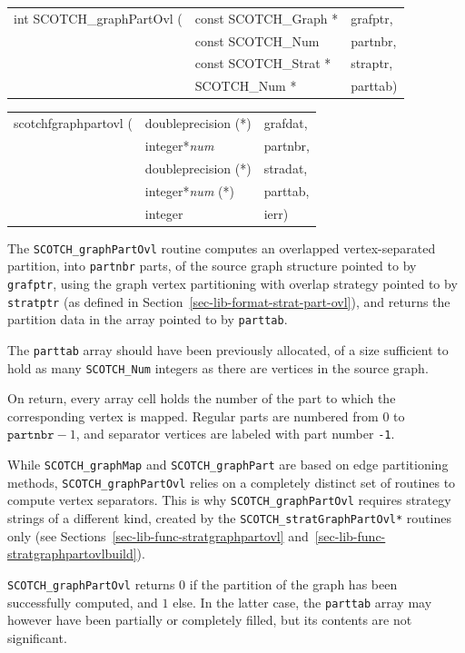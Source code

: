 \begin{itemize}
\progsyn

{\tt\begin{tabular}{l@{}ll}
int SCOTCH\_graphPartOvl ( & const SCOTCH\_Graph * & grafptr, \\
                           & const SCOTCH\_Num     & partnbr, \\
                           & const SCOTCH\_Strat * & straptr, \\
                           & SCOTCH\_Num *         & parttab)
\end{tabular}}

{\tt\begin{tabular}{l@{}ll}
scotchfgraphpartovl ( & doubleprecision (*)   & grafdat, \\
                      & integer*{\it num}     & partnbr, \\
                      & doubleprecision (*)   & stradat, \\
                      & integer*{\it num} (*) & parttab, \\
                      & integer               & ierr)
\end{tabular}}

\progdes

The {\tt SCOTCH\_graphPartOvl} routine computes an overlapped
vertex-separated partition, into {\tt partnbr} parts, of the source
graph structure pointed to by {\tt grafptr}, using the graph vertex
partitioning with overlap strategy pointed to by {\tt stratptr} (as
defined in Section~\ref{sec-lib-format-strat-part-ovl}), and returns
the partition data in the array pointed to by {\tt parttab}.

The {\tt parttab} array should have been previously allocated, of a
size sufficient to hold as many {\tt SCOTCH\_\lbt Num} integers as
there are vertices in the source graph.

On return, every array cell holds the number of the part to which the
corresponding vertex is mapped. Regular parts are numbered from $0$ to
$\mathtt{partnbr} - 1$, and separator vertices are labeled with part
number {\tt -1}.

While {\tt SCOTCH\_graphMap} and {\tt SCOTCH\_\lbt graph\lbt Part} are
based on edge partitioning methods,
{\tt SCOTCH\_\lbt graph\lbt Part\lbt Ovl} relies on a completely
distinct set of routines to compute vertex separators. This is why
{\tt SCOTCH\_\lbt graph\lbt Part\lbt Ovl} requires strategy strings of
a different kind, created by the
{\tt SCOTCH\_\lbt strat\lbt Graph\lbt   Part\lbt Ovl*} routines only
(see Sections~\ref{sec-lib-func-stratgraphpartovl}
and~\ref{sec-lib-func-stratgraphpartovlbuild}).

\progret

{\tt SCOTCH\_graphPartOvl} returns $0$ if the partition of the graph
has been successfully computed, and $1$ else. In the latter case, the
{\tt parttab} array may however have been partially or completely
filled, but its contents are not significant.
\end{itemize}

